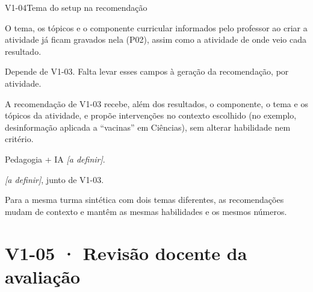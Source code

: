 \begin{resposta}{V1-04}{Tema do setup na recomendação}{\naoimpl}
\begin{campos}
  \item[Existe] O tema, os tópicos e o componente curricular informados pelo
    professor ao criar a atividade já ficam gravados nela (P02), assim como
    a atividade de onde veio cada resultado.
  \item[Diferença] Depende de V1-03. Falta levar esses campos à geração da
    recomendação, por atividade.
  \item[Proposta] A recomendação de V1-03 recebe, além dos resultados, o
    componente, o tema e os tópicos da atividade, e propõe intervenções no
    contexto escolhido (no exemplo, desinformação aplicada a ``vacinas'' em
    Ciências), sem alterar habilidade nem critério.
  \item[Responsável] Pedagogia + IA \textit{[a definir]}.
  \item[Homologação] \textit{[a definir]}, junto de V1-03.
  \item[Aceite] Para a mesma turma sintética com dois temas diferentes, as
    recomendações mudam de contexto e mantêm as mesmas habilidades e os
    mesmos números.
\end{campos}
\end{resposta}

\section{V1-05 · Revisão docente da avaliação}

